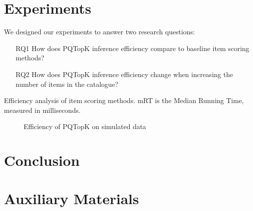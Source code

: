 \documentclass[sigconf,natbib=true, review=true]{acmart} %
\begin{document}
\section{Experiments}\label{sec:experiments}
We designed our experiments to answer two research questions: 
\begin{itemize}
    \item[RQ1] How does PQTopK inference efficiency compare to baseline item scoring methods? 
    \item[RQ2] How does PQTopK inference efficiency change when increasing the number of items in the catalogue? 
\end{itemize}

\begin{table}
\caption{Efficiency analysis of item scoring methods. mRT is the Median Running Time, measured in milliseconds.}
\resizebox{\linewidth}{!}{
    
}
\end{table}


\begin{figure}
    \centering
    \caption{Efficiency of PQTopK on simulated data}
    \label{fig:enter-label}
\end{figure}

\section{Conclusion}\label{sec:conclusion}




\balance


\appendix
\section{Auxiliary Materials}
\end{document}
